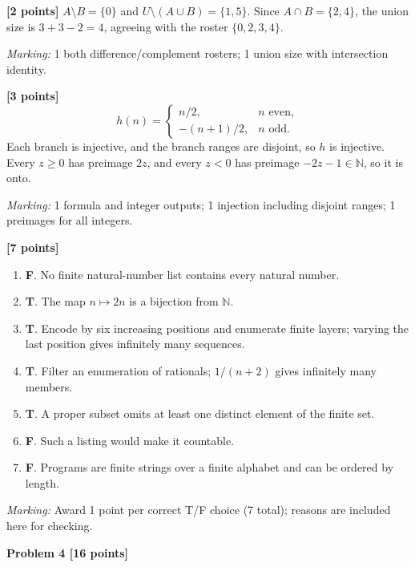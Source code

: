 \documentclass[12pt,letterpaper]{article}
\newcommand{\problemheading}[2][5\baselineskip]{\Needspace{#1}\par\noindent\hspace*{-0.625in}\textbf{#2}\par\nobreak\vspace{0.3em}}
\begin{document}
\begin{description}[font=\normalfont,leftmargin=1.2em,labelsep=0.4em]
\item[(a)] \textbf{[2 points]} $A\setminus B=\{0\}$ and $U\setminus(A\cup B)=\{1,5\}$. Since $A\cap B=\{2,4\}$, the union size is $3+3-2=4$, agreeing with the roster $\{0,2,3,4\}$.
\par\textit{Marking:} 1 both difference/complement rosters; 1 union size with intersection identity.
\item[(b)] \textbf{[3 points]} \[h(n)=\begin{cases}n/2,&n\text{ even},\\-(n+1)/2,&n\text{ odd}.\end{cases}\] Each branch is injective, and the branch ranges are disjoint, so $h$ is injective. Every $z\ge0$ has preimage $2z$, and every $z<0$ has preimage $-2z-1\in\mathbb N$, so it is onto.
\par\textit{Marking:} 1 formula and integer outputs; 1 injection including disjoint ranges; 1 preimages for all integers.
\item[(c)] \textbf{[7 points]} \begin{enumerate}[label=(\roman*)]\item \textbf{F}. No finite natural-number list contains every natural number.\item \textbf{T}. The map $n\mapsto2n$ is a bijection from $\mathbb N$.\item \textbf{T}. Encode by six increasing positions and enumerate finite layers; varying the last position gives infinitely many sequences.\item \textbf{T}. Filter an enumeration of rationals; $1/(n+2)$ gives infinitely many members.\item \textbf{T}. A proper subset omits at least one distinct element of the finite set.\item \textbf{F}. Such a listing would make it countable.\item \textbf{F}. Programs are finite strings over a finite alphabet and can be ordered by length.\end{enumerate}
\par\textit{Marking:} Award 1 point per correct T/F choice (7 total); reasons are included here for checking.
\end{description}
\vspace{0.65em}
\problemheading[\dimexpr 3\baselineskip+4\baselineskip\relax]{Problem 4 [16 points]}
\end{document}
